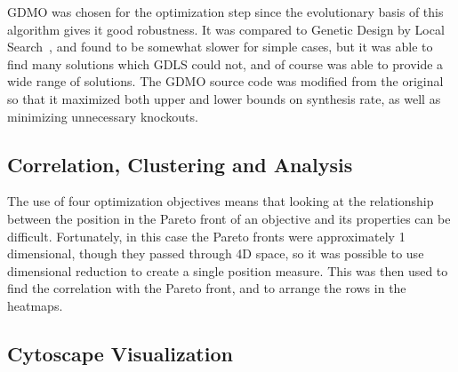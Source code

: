 \documentclass[a4paper,twocolumn]{article}
\begin{document}
GDMO was chosen for the optimization step since the evolutionary basis of this algorithm gives it good robustness. It was compared to Genetic Design by Local Search~\cite{Lun2009}, and found to be somewhat slower for simple cases, but it was able to find many solutions which GDLS could not, and of course was able to provide a wide range of solutions. The GDMO source code was modified from the original so that it maximized both upper and lower bounds on synthesis rate, as well as minimizing unnecessary knockouts.

\subsection{Correlation, Clustering and Analysis}
The use of four optimization objectives means that looking at the relationship between the position in the Pareto front of an objective and its properties can be difficult. Fortunately, in this case the Pareto fronts were approximately 1 dimensional, though they passed through 4D space, so it was possible to use dimensional reduction to create a single position measure. This was then used to find the correlation with the Pareto front, and to arrange the rows in the heatmaps.

\subsection{Cytoscape Visualization}




\nocite{R-base,R-ggplot2,R-RCytoscape}



\end{document}
